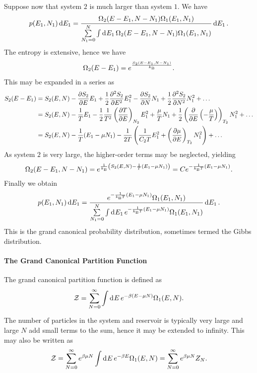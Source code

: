 Suppose now that system $2$ is much larger than system $1$. We have
\begin{align*}
	p(E_{1}, N_{1})\dd{E_{1}} = \frac{\Omega_{2}(E - E_{1}, N - N_{1})\Omega_{1}(E_{1}, N_{1})}{\sum\limits_{N_{1} = 0}^{N}\int\limits_{}^{}\dd[]{E_{1}}\Omega_{2}(E - E_{1}, N - N_{1})\Omega_{1}(E_{1}, N_{1})}\dd{E_{1}}.
\end{align*}
The entropy is extensive, hence we have
\begin{align*}
	\Omega_{2}(E - E_{1}) = e^{\frac{S_{2}(E - E_{1}, N - N_{1})}{k_{\text{B}}}}.
\end{align*}
This may be expanded in a series as
\begin{align*}
	S_{2}(E - E_{1}) &= S_{2}(E, N) - \pdv{S_{2}}{E}E_{1} + \frac{1}{2}\pdv[2]{S_{2}}{E}E_{1}^{2} - \pdv{S_{2}}{N}N_{1} + \frac{1}{2}\pdv[2]{S_{2}}{N}N_{1}^{2} + \dots \\
	                  &= S_{2}(E, N) - \frac{1}{T}E_{1} - \frac{1}{2}\frac{1}{T^{2}}\left(\pdv{T}{E}\right)_{N_{2}}E_{1}^{2} + \frac{\mu}{T}N_{1} + \frac{1}{2}\left(\pdv{E}\left(-\frac{\mu}{T}\right)\right)_{T_{2}}N_{1}^{2} + \dots \\
	                  &= S_{2}(E, N) - \frac{1}{T}(E_{1} - \mu N_{1}) - \frac{1}{2T}\left(\frac{1}{C_{2}T}E_{1}^{2} + \left(\pdv{\mu}{E}\right)_{T_{2}}N_{1}^{2}\right) + \dots
\end{align*}
As system $2$ is very large, the higher-order terms may be neglected, yielding
\begin{align*}
	\Omega_{2}(E - E_{1}, N - N_{1}) = e^{\frac{1}{k_{\text{B}}}\left(S_{2}(E, N) - \frac{1}{T}(E_{1} - \mu N_{1})\right)} = Ce^{-\frac{1}{k_{\text{B}} T}(E_{1} - \mu N_{1})}.
\end{align*}
Finally we obtain
\begin{align*}
	p(E_{1}, N_{1})\dd{E_{1}} = \frac{e^{-\frac{1}{k_{\text{B}} T}(E_{1} - \mu N_{1})}\Omega_{1}(E_{1}, N_{1})}{\sum\limits_{N_{1} = 0}^{N}\int\limits_{}^{}\dd[]{E_{1}}e^{-\frac{1}{k_{\text{B}} T}(E_{1} - \mu N_{1})}\Omega_{1}(E_{1}, N_{1})}\dd{E_{1}}.
\end{align*}
This is the grand canonical probability distribution, sometimes termed the Gibbs distribution.

\paragraph{The Grand Canonical Partition Function}
The grand canonical partition function is defined as
\begin{align*}
	\mathcal{Z} = \sum\limits_{N = 0}^{\infty}\int\limits_{}^{}\dd[]{E}e^{-\beta(E - \mu N)}\Omega_{1}(E, N).
\end{align*}
The number of particles in the system and reservoir is typically very large and large $N$ add small terms to the sum, hence it may be extended to infinity. This may also be written as
\begin{align*}
	\mathcal{Z} = \sum\limits_{N = 0}^{\infty}e^{\beta\mu N}\int\limits_{}^{}\dd[]{E}e^{-\beta E}\Omega_{1}(E, N) = \sum\limits_{N = 0}^{\infty}e^{\beta\mu N}Z_{N}.
\end{align*}

